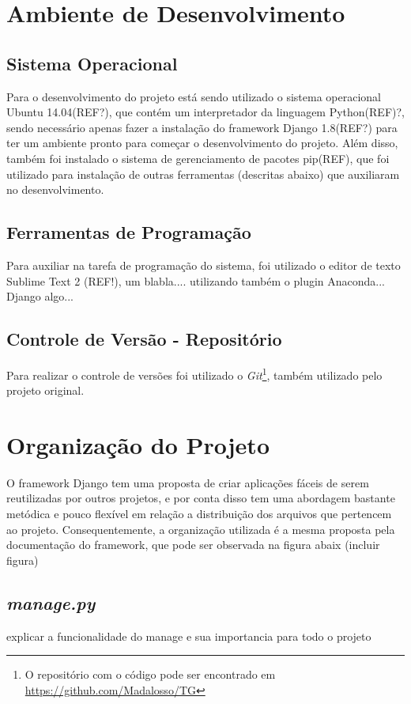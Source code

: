 \documentclass[tg]{mdtufsm}
\begin{document}
\section{Ambiente de Desenvolvimento}

\subsection{Sistema Operacional}

Para o desenvolvimento do projeto está sendo utilizado o sistema operacional Ubuntu 14.04(REF?), que contém um interpretador da linguagem Python(REF)?, sendo necessário apenas fazer a instalação do framework Django 1.8(REF?) para ter um ambiente pronto para começar o desenvolvimento do projeto. Além disso, também foi instalado o sistema de gerenciamento de pacotes pip(REF), que foi utilizado para instalação de outras ferramentas (descritas abaixo) que auxiliaram no desenvolvimento.

\subsection{Ferramentas de Programação}
Para auxiliar na tarefa de programação do sistema, foi utilizado o editor de texto Sublime Text 2 (REF!), um blabla.... utilizando também o plugin Anaconda... Django algo...

\subsection{Controle de Versão - Repositório}

Para realizar o controle de versões foi utilizado o \emph{Git}\footnote{O repositório com o código pode ser encontrado em \url{https://github.com/Madalosso/TG}}, também utilizado pelo projeto original.

\section{Organização do Projeto}

O framework Django tem uma proposta de criar aplicações fáceis de serem reutilizadas por outros projetos, e por conta disso tem uma abordagem bastante metódica e pouco flexível em relação a distribuição dos arquivos que pertencem ao projeto. Consequentemente, a organização utilizada é a mesma proposta pela documentação do framework, que pode ser observada na figura abaix (incluir figura)

\subsection{\emph{manage.py}}
explicar a funcionalidade do manage e sua importancia para todo o projeto
\end{document}
